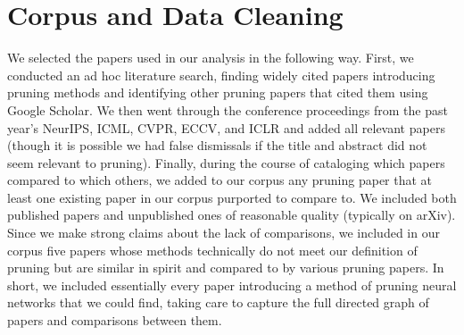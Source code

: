

\section{Corpus and Data Cleaning} \label{sec:corpus}


We selected the \npapers papers used in our analysis in the following way. First, we conducted an ad hoc literature search, finding widely cited papers introducing pruning methods and identifying other pruning papers that cited them using Google Scholar. We then went through the conference proceedings from the past year's NeurIPS, ICML, CVPR, ECCV, and ICLR and added all relevant papers (though it is possible we had false dismissals if the title and abstract did not seem relevant to pruning). Finally, during the course of cataloging which papers compared to which others, we added to our corpus any pruning paper that at least one existing paper in our corpus purported to compare to. We included both published papers and unpublished ones of reasonable quality (typically on arXiv). Since we make strong claims about the lack of comparisons, we included in our corpus five papers whose methods technically do not meet our definition of pruning but are similar in spirit and compared to by various pruning papers.
In short, we included essentially every paper introducing a method of pruning neural networks that we could find, taking care to capture the full directed graph of papers and comparisons between them.

